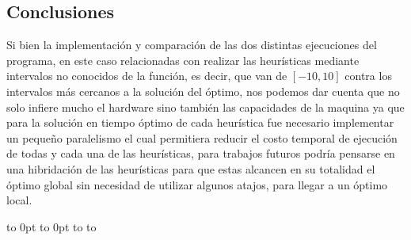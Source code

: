\documentclass[10pt]{article}
\def\fillandplacepagenumber{%
 \par\pagestyle{empty}%
 \vbox to 0pt{\vss}\vfill
 \vbox to 0pt{\baselineskip0pt
   \hbox to\linewidth{\hss}%
   \baselineskip\footskip
   \hbox to\linewidth{%
     \hfil\thepage\hfil}\vss}}
\begin{document}
\begin{landscape}
  \section{Conclusiones}
  Si bien la implementación y comparación de las dos distintas ejecuciones del programa, en este caso relacionadas con realizar las heurísticas mediante intervalos no conocidos de la función, es decir, que van de $[-10,10]$ contra los intervalos más cercanos a la solución del óptimo, nos podemos dar cuenta que no solo infiere mucho el hardware sino también las capacidades de la maquina ya que para la solución en tiempo óptimo de cada heurística fue necesario implementar un pequeño paralelismo el cual permitiera reducir el costo temporal de ejecución de todas y cada una de las heurísticas, para trabajos futuros podría pensarse en una hibridación de las heurísticas para que estas alcancen en su totalidad el óptimo global sin necesidad de utilizar algunos atajos, para llegar a un óptimo local.

  \fillandplacepagenumber
\end{landscape}
\end{document}
